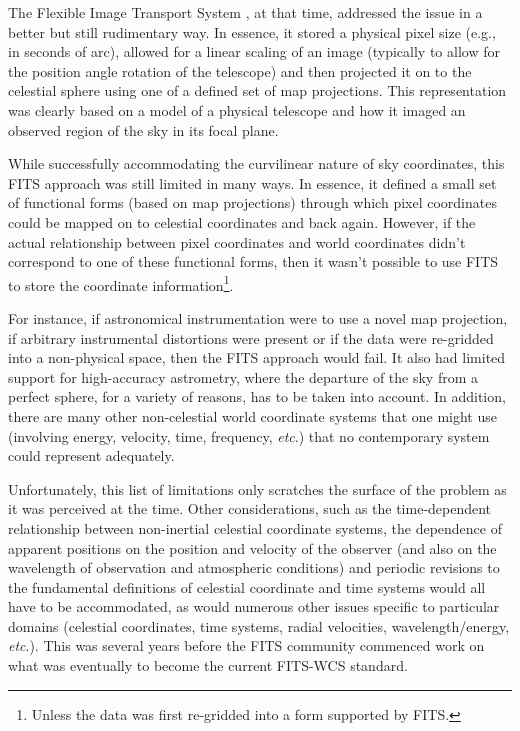 \documentclass[final,authoryear,5p,times,twocolumn]{elsarticle}
\begin{document}
The Flexible Image Transport System
\citep[FITS;][]{1981A&AS...44..363W,1995ASPC...77..233G}, at that
time, addressed the issue in a better but still rudimentary way. In
essence, it stored a physical pixel size (e.g., in seconds of arc),
allowed for a linear scaling of an image (typically to allow for the
position angle rotation of the telescope) and then projected it on to
the celestial sphere using one of a defined set of map
projections. This representation was clearly based on a model of a
physical telescope and how it imaged an observed region of the sky in
its focal plane.

While successfully accommodating the curvilinear nature of sky
coordinates, this FITS approach was still limited in many ways. In
essence, it defined a small set of functional forms (based on map
projections) through which pixel coordinates could be mapped on to
celestial coordinates and back again. However, if the actual
relationship between pixel coordinates and world coordinates didn't
correspond to one of these functional forms, then it wasn't possible
to use FITS to store the coordinate information\footnote{Unless the data was
first re-gridded into a form supported by FITS.}.

For instance, if astronomical instrumentation were to use a novel map
projection, if arbitrary instrumental distortions were present or if
the data were re-gridded into a non-physical space, then the FITS
approach would fail. It also had limited support for high-accuracy
astrometry, where the departure of the sky from a perfect sphere, for
a variety of reasons, has to be taken into account. In addition, there
are many other non-celestial world coordinate systems that one might
use (involving energy, velocity, time, frequency, \emph{etc}.) that no
contemporary system could represent adequately.

Unfortunately, this list of limitations only scratches the surface of
the problem as it was perceived at the time. Other considerations,
such as the time-dependent relationship between non-inertial celestial
coordinate systems, the dependence of apparent positions on the
position and velocity of the observer (and also on the wavelength of
observation and atmospheric conditions) and periodic revisions to the
fundamental definitions of celestial coordinate and time systems would
all have to be accommodated, as would numerous other issues specific
to particular domains (celestial coordinates, time systems, radial
velocities, wavelength/energy, \emph{etc}.). This was several years before the
FITS community commenced work on what was eventually to become the current
FITS-WCS standard.
\end{document}
